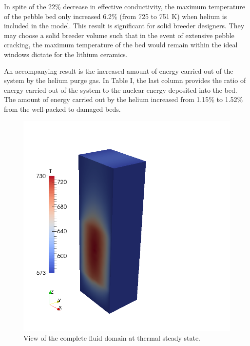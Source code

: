 In spite of the 22\% decrease in effective conductivity, the maximum temperature of the pebble bed only increased 6.2\% (from 725 to 751 K) when helium is included in the model. This result is significant for solid breeder designers. They may choose a solid breeder volume such that in the event of extensive pebble cracking, the maximum temperature of the bed would remain within the ideal windows dictate for the lithium ceramics.

An accompanying result is the increased amount of energy carried out of the system by the helium purge gas. In Table I, the last column provides the ratio of energy carried out of the system to the nuclear energy deposited into the bed. The amount of energy carried out by the helium increased from 1.15\% to 1.52\% from the well-packed to damaged beds.

\begin{figure}[t]
    \centering
    \includegraphics[width=\singleimagewidth]{chapters/figures/full-cfd-dem-fluid-temp}
    \caption{View of the complete fluid domain at thermal steady state.}\label{fig:cfdem-complete-domain}
\end{figure}


